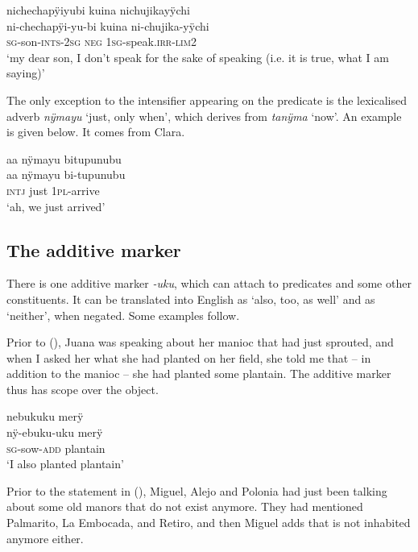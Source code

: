 \ea\label{ex:yu-HON}
\begingl
\glpreamble nichechapÿiyubi kuina nichujikayÿchi\\
\gla ni-chechapÿi-yu-bi kuina ni-chujika-yÿchi\\
\textsc{sg}-son-\textsc{ints}-2\textsc{sg} \textsc{neg} 1\textsc{sg}-speak.\textsc{irr}-\textsc{lim}2\\
\glft ‘my dear son, I don’t speak for the sake of speaking (i.e. it is true, what I am saying)’
\endgl
\trailingcitation{[ump-p110815sf.500]}
\xe

The only exception to the intensifier appearing on the predicate is the lexicalised adverb \textit{nÿmayu} ‘just, only when’, which derives from \textit{tanÿma} ‘now’. An example is given below. It comes from Clara.

\ea
\begingl
\glpreamble aa nÿmayu bitupunubu\\
\gla aa nÿmayu bi-tupunubu\\
\glb \textsc{intj} just 1\textsc{pl}-arrive\\
\glft ‘ah, we just arrived’
\endgl
\trailingcitation{[cux-c120510l-1.278]}
\xe
{}

\subsection{The additive marker}\label{sec:Additive}

There is one additive marker \textit{-uku}, which can attach to predicates and some other constituents. It can be translated into English as ‘also, too, as well’ and as ‘neither’, when negated. Some examples follow.

Prior to (), Juana  was speaking about her manioc that had just sprouted, and when I asked her what she had planted on her field, she told me that – in addition to the manioc – she had planted some plantain. The additive marker thus has scope over the object.

\ea\label{ex:ADD-verbal}
\begingl
\glpreamble nebukuku merÿ\\
\gla nÿ-ebuku-uku merÿ\\
\textsc{sg}-sow-\textsc{add} plantain\\
\glft ‘I also planted plantain’
\endgl
\trailingcitation{[jxx-e110923l-2.063]}
\xe

Prior to the statement in (), Miguel, Alejo and Polonia had just been talking about some old manors that do not exist anymore. They had mentioned Palmarito, La Embocada, and Retiro, and then Miguel adds that  is not inhabited anymore either.

